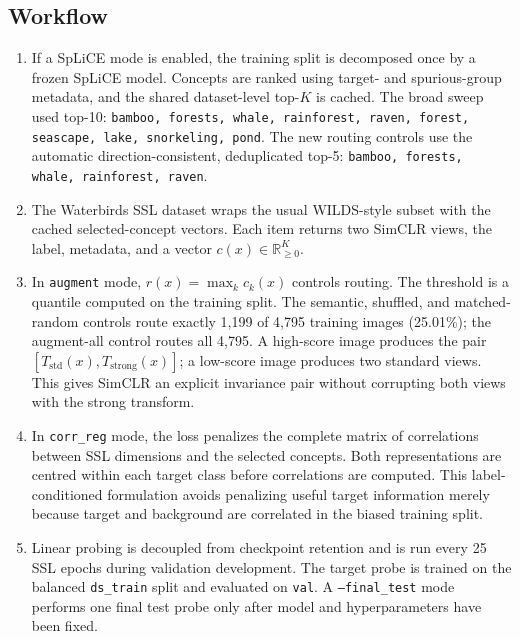 \documentclass[11pt,a4paper]{article}
\begin{document}
\subsection{Workflow}

\begin{enumerate}

    \item If a SpLiCE mode is enabled, the training split is decomposed once by
    a frozen SpLiCE model. Concepts are ranked using target- and spurious-group
    metadata, and the shared dataset-level top-$K$ is cached. The broad sweep
    used top-10: \texttt{bamboo, forests, whale, rainforest, raven, forest,
    seascape, lake, snorkeling, pond}. The new routing controls use the automatic
    direction-consistent, deduplicated top-5:
    \texttt{bamboo, forests, whale, rainforest, raven}.

    \item The Waterbirds SSL dataset wraps the usual WILDS-style subset with
    the cached selected-concept vectors. Each item returns two SimCLR views,
    the label, metadata, and a vector $c(x)\in\mathbb{R}^{K}_{\geq 0}$.

    \item In \texttt{augment} mode, $r(x)=\max_k c_k(x)$ controls routing. The
    threshold is a quantile computed on the training split. The semantic,
    shuffled, and matched-random controls route exactly 1,199 of 4,795 training
    images (25.01\%); the augment-all control routes all 4,795. A high-score image produces the pair
    $[T_{\mathrm{std}}(x),T_{\mathrm{strong}}(x)]$; a low-score image produces
    two standard views. This gives SimCLR an explicit invariance pair without
    corrupting both views with the strong transform.

    \item In \texttt{corr\_reg} mode, the loss penalizes the complete matrix of
    correlations between SSL dimensions and the selected concepts. Both
    representations are centred within each target class before correlations
    are computed. This label-conditioned formulation avoids penalizing useful
    target information merely because target and background are correlated in
    the biased training split.

    \item Linear probing is decoupled from checkpoint retention and is run every
    25 SSL epochs during validation development. The target probe is trained on
    the balanced \texttt{ds\_train} split and evaluated on \texttt{val}. A
    \texttt{--final\_test} mode performs one final test probe only after model
    and hyperparameters have been fixed.
\end{enumerate}
\end{document}

